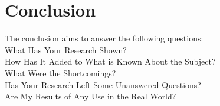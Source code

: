 \section{Conclusion}
\label{Conclusion}

The conclusion aims to answer the following questions: \\
What Has Your Research Shown?\\
How Has It Added to What is Known About the Subject?\\
What Were the Shortcomings?\\
Has Your Research Left Some Unanswered Questions?\\
Are My Results of Any Use in the Real World?

